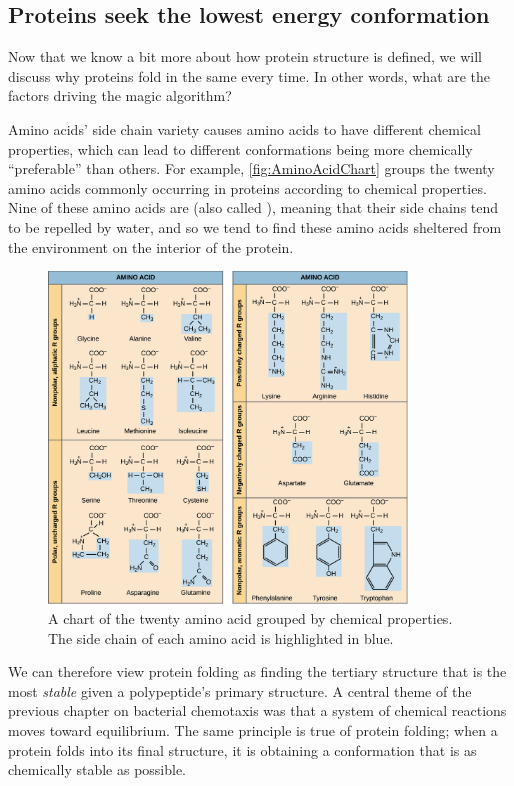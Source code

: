 \FloatBarrier
\subsection{Proteins seek the lowest energy conformation}

Now that we know a bit more about how protein structure is defined, we will discuss why proteins fold in the same every time. In other words, what are the factors driving the magic algorithm?

Amino acids' side chain variety causes amino acids to have different chemical properties, which can lead to different conformations being more chemically ``preferable'' than others. For example, \autoref{fig:AminoAcidChart} groups the twenty amino acids commonly occurring in proteins according to chemical properties. Nine of these amino acids are  (also called ), meaning that their side chains tend to be repelled by water, and so we tend to find these amino acids sheltered from the environment on the interior of the protein.

\begin{figure}[h]
	\centering
	\mySfFamily
	\includegraphics[width = 0.85\textwidth]{../images/AminoAcidChart.png}
	\caption{A chart of the twenty amino acid grouped by chemical properties. The side chain of each amino acid is highlighted in blue.}
	\label{fig:AminoAcidChart}
\end{figure}

We can therefore view protein folding as finding the tertiary structure that is the most \textit{stable} given a polypeptide's primary structure. A central theme of the previous chapter on bacterial chemotaxis was that a system of chemical reactions moves toward equilibrium. The same principle is true of protein folding; when a protein folds into its final structure, it is obtaining a conformation that is as chemically stable as possible.

